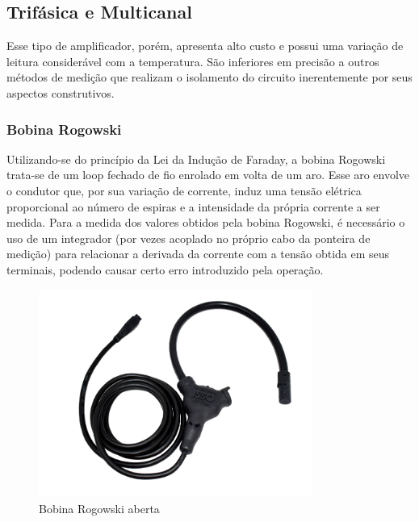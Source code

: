     \subsection{Trifásica e Multicanal}\label{subsec:aqSMulti}
        


Esse tipo de amplificador, porém, apresenta alto custo e possui uma variação de leitura considerável com a temperatura. São inferiores em precisão a outros métodos de medição que realizam o isolamento do circuito inerentemente por seus aspectos construtivos. 

\subsubsection{Bobina Rogowski}\label{subsubsec:Rogowski}

Utilizando-se do princípio da Lei da Indução de Faraday, a bobina Rogowski trata-se de um loop fechado de fio enrolado em volta de um aro. Esse aro envolve o condutor que, por sua variação de corrente, induz uma tensão elétrica proporcional ao número de espiras e a intensidade da própria corrente a ser medida. Para a medida dos valores obtidos pela bobina Rogowski, é necessário o uso de um integrador (por vezes acoplado no próprio cabo da ponteira de medição) para relacionar a derivada da corrente com a tensão obtida em seus terminais, podendo causar certo erro introduzido pela operação.

\begin{figure}[htb]
    \caption{Bobina Rogowski aberta}
    \label{fig:rogowski-bobina}
    \includegraphics[width=0.8\textwidth]{figuras/bobina-rogowski.png}
\end{figure}

